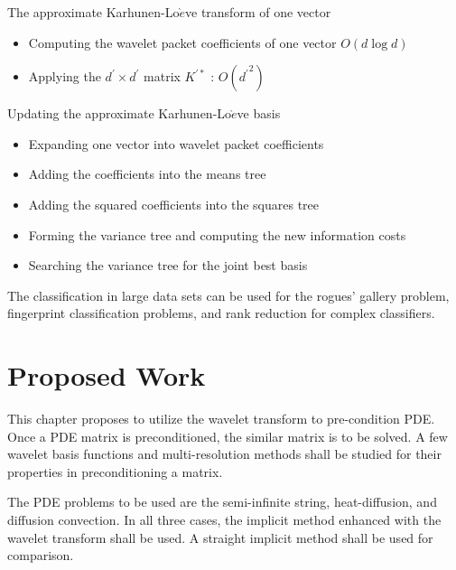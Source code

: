 The approximate Karhunen-Lo$\grave{e}$ve transform of one vector 
\begin{itemize}
\item Computing the wavelet packet coefficients of one vector $O(d \log d)$
\item Applying the $d^\prime \times d^\prime$ matrix $K^{\prime \ast}$ : $O({d^\prime}^2)$
\end{itemize}

Updating the approximate Karhunen-Lo$\grave{e}$ve basis 
\begin{itemize}
\item Expanding one vector into wavelet packet coefficients 
\item Adding the coefficients into the means tree
\item Adding the squared coefficients into the squares tree
\item Forming the variance tree and computing the new information costs
\item Searching the variance tree for the joint best basis
\end{itemize}

The classification in large data sets can be used for the rogues' gallery problem, fingerprint classification problems, and rank reduction for complex classifiers.  


\section {Proposed Work}
This chapter proposes to utilize the wavelet transform to pre-condition PDE.  Once a PDE matrix is preconditioned,  the similar matrix is to be solved.  A few wavelet basis functions and multi-resolution methods shall be studied for their properties in preconditioning a matrix.  

The PDE problems to be used are the semi-infinite string, heat-diffusion, and diffusion convection.    In all three cases, the implicit method enhanced with the wavelet transform shall be used.  A straight implicit method shall be used for comparison.  

